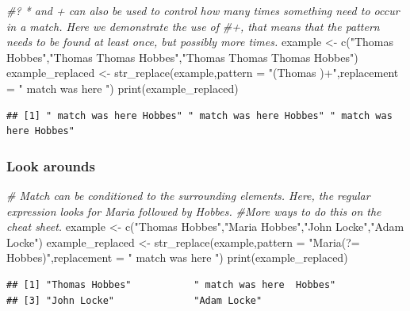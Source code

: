 \documentclass[
]{book}
\newenvironment{Shaded}{\begin{snugshade}}{\end{snugshade}}
\newcommand{\AttributeTok}[1]{\textcolor[rgb]{0.77,0.63,0.00}{#1}}
\newcommand{\CommentTok}[1]{\textcolor[rgb]{0.56,0.35,0.01}{\textit{#1}}}
\newcommand{\FunctionTok}[1]{\textcolor[rgb]{0.00,0.00,0.00}{#1}}
\newcommand{\NormalTok}[1]{#1}
\newcommand{\OtherTok}[1]{\textcolor[rgb]{0.56,0.35,0.01}{#1}}
\newcommand{\StringTok}[1]{\textcolor[rgb]{0.31,0.60,0.02}{#1}}
\begin{document}
\begin{Shaded}
\begin{Highlighting}[]
\CommentTok{\#? * and + can also be used to control how many times something need to occur in a match. Here we demonstrate the use of}
\CommentTok{\#+, that means that the pattern needs to be found at least once, but possibly more times.}
\NormalTok{example }\OtherTok{\textless{}{-}} \FunctionTok{c}\NormalTok{(}\StringTok{"Thomas Hobbes"}\NormalTok{,}\StringTok{"Thomas Thomas Hobbes"}\NormalTok{,}\StringTok{"Thomas Thomas Thomas Hobbes"}\NormalTok{)}
\NormalTok{example\_replaced }\OtherTok{\textless{}{-}} \FunctionTok{str\_replace}\NormalTok{(example,}\AttributeTok{pattern =} \StringTok{"(Thomas )+"}\NormalTok{,}\AttributeTok{replacement =} \StringTok{" match was here "}\NormalTok{)}
\FunctionTok{print}\NormalTok{(example\_replaced)}
\end{Highlighting}
\end{Shaded}

\begin{verbatim}
## [1] " match was here Hobbes" " match was here Hobbes" " match was here Hobbes"
\end{verbatim}

\hypertarget{look-arounds}{%
\subsubsection{Look arounds}\label{look-arounds}}

\begin{Shaded}
\begin{Highlighting}[]
\CommentTok{\# Match can be conditioned to the surrounding elements. Here, the regular expression looks for Maria followed by Hobbes.}
\CommentTok{\#More ways to do this on the cheat sheet.}
\NormalTok{example }\OtherTok{\textless{}{-}}  \FunctionTok{c}\NormalTok{(}\StringTok{"Thomas Hobbes"}\NormalTok{,}\StringTok{"Maria Hobbes"}\NormalTok{,}\StringTok{"John Locke"}\NormalTok{,}\StringTok{"Adam Locke"}\NormalTok{)}
\NormalTok{example\_replaced }\OtherTok{\textless{}{-}} \FunctionTok{str\_replace}\NormalTok{(example,}\AttributeTok{pattern =} \StringTok{"Maria(?= Hobbes)"}\NormalTok{,}\AttributeTok{replacement =} \StringTok{" match was here "}\NormalTok{)}
\FunctionTok{print}\NormalTok{(example\_replaced)}
\end{Highlighting}
\end{Shaded}

\begin{verbatim}
## [1] "Thomas Hobbes"           " match was here  Hobbes"
## [3] "John Locke"              "Adam Locke"
\end{verbatim}
\end{document}

